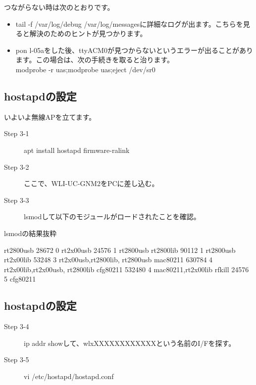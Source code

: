 \documentclass[mingoth,a4paper]{jsarticle}
\begin{document}
 つながらない時は次のとおりです。

 \begin{itemize}
 \item tail -f /var/log/debug /var/log/messagesに詳細なログが出ます。こちらを見ると解決のためのヒントが見つかります。
 \item pon l-05aをした後、ttyACM0が見つからないというエラーが出ることがあります。この場合は、次の手続きを取ると治ります。\\
 modprobe -r uas;modprobe uas;eject /dev/sr0
 \end{itemize} 



\subsection{hostapdの設定}

  いよいよ無線APを立てます。

  \begin{description}
  \item [Step 3-1] apt install hostapd firmware-ralink
  \item [Step 3-2] ここで、WLI-UC-GNM2をPCに差し込む。
  \item [Step 3-3] lsmodして以下のモジュールがロードされたことを確認。
  \end{description}      
 lsmodの結果抜粋
\begin{commandline}
rt2800usb              28672  0
rt2x00usb              24576  1 rt2800usb
rt2800lib              90112  1 rt2800usb
rt2x00lib              53248  3 rt2x00usb,rt2800lib,
                                rt2800usb
mac80211              630784  4 rt2x00lib,rt2x00usb,
                                rt2800lib
cfg80211              532480  4 mac80211,rt2x00lib
rfkill                 24576  5 cfg80211
\end{commandline}



\subsection{hostapdの設定}

  \begin{description}
  \item [Step 3-4] ip addr showして、wlxXXXXXXXXXXXXという名前のI/Fを探す。
  \item [Step 3-5] vi /etc/hostapd/hostapd.conf
  \end{description}      
\end{document}
